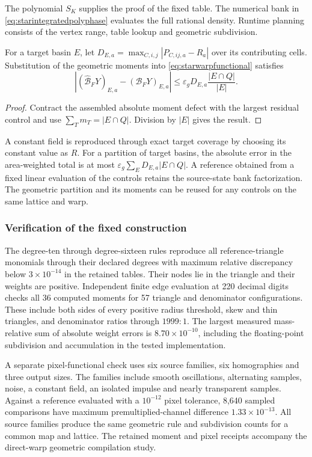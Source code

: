 The polynomial $S_K$ supplies the proof of the fixed table. The numerical
bank in \eqref{eq:starintegratedpolyphase} evaluates the full rational
density. Runtime planning consists of the vertex range, table lookup and
geometric subdivision.

\begin{proposition}
For a target basin $E$, let
$D_{E,a}=\max_{C,i,j}|P_{C,ij,a}-R_a|$ over its contributing cells.
Substitution of the geometric moments into \eqref{eq:starwarpfunctional}
satisfies
\begin{equation}
 |(\widehat{\mathcal B}_FY)_{E,a}-(\mathcal B_FY)_{E,a}|
 \leq\varepsilon_gD_{E,a}\frac{|E\cap Q|}{|E|}.
 \label{eq:starwarperror}
\end{equation}
\end{proposition}
\begin{proof}
Contract the assembled absolute moment defect with the largest residual
control and use $\sum_Tm_T=|E\cap Q|$. Division by $|E|$ gives the result.
\end{proof}

A constant field is reproduced through exact target coverage by choosing
its constant value as $R$. For a partition of target basins, the absolute
error in the area-weighted total is at most
$\varepsilon_g\sum_E D_{E,a}|E\cap Q|$. A reference obtained from a fixed
linear evaluation of the controls retains the source-state bank
factorization. The geometric partition and its moments can be reused for
any controls on the same lattice and warp.

\subsubsection{Verification of the fixed construction}
The degree-ten through degree-sixteen rules reproduce all reference-triangle
monomials through their declared degrees with maximum relative discrepancy
below $3\times10^{-14}$ in the retained tables. Their nodes lie in the
triangle and their weights are positive. Independent finite edge evaluation
at 220 decimal digits checks all 36 computed moments for 57 triangle and
denominator configurations. These include both sides of every positive
radius threshold, skew and thin triangles, and denominator ratios through
$1999:1$. The largest measured mass-relative sum of absolute weight errors
is $8.70\times10^{-10}$, including the floating-point subdivision and
accumulation in the tested implementation.

A separate pixel-functional check uses six source families, six homographies
and three output sizes. The families include smooth oscillations, alternating
samples, noise, a constant field, an isolated impulse and nearly transparent
samples. Against a reference evaluated with a $10^{-12}$ pixel tolerance,
8,640 sampled comparisons have maximum premultiplied-channel difference
$1.33\times10^{-13}$. All source families produce the same geometric rule
and subdivision counts for a common map and lattice. The retained moment
and pixel receipts accompany the direct-warp geometric compilation study.

